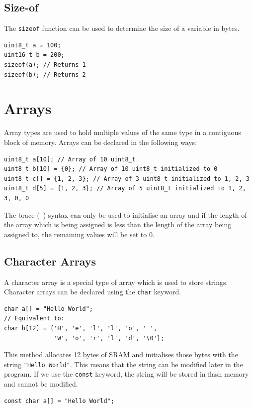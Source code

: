 \documentclass{report}
\begin{document}
\subsection{Size-of}
The \texttt{sizeof} function can be used to determine the size of a variable in bytes.
\begin{verbatim}
uint8_t a = 100;
uint16_t b = 200;
sizeof(a); // Returns 1
sizeof(b); // Returns 2
\end{verbatim}
\section{Arrays}
Array types are used to hold multiple values of the same type
in a contiguous block of memory.
Arrays can be declared in the following ways:
\begin{verbatim}
uint8_t a[10]; // Array of 10 uint8_t
uint8_t b[10] = {0}; // Array of 10 uint8_t initialized to 0
uint8_t c[] = {1, 2, 3}; // Array of 3 uint8_t initialized to 1, 2, 3
uint8_t d[5] = {1, 2, 3}; // Array of 5 uint8_t initialized to 1, 2, 3, 0, 0
\end{verbatim}
The brace (\texttt{{ }}) syntax can only be used to initialise an array and if the length of the array which is being
assigned is less than the length of the array being assigned to, the remaining values will be set to 0.
\subsection{Character Arrays}
A character array is a special type of array which is used to store strings.
Character arrays can be declared using the \texttt{char} keyword.
\begin{verbatim}
char a[] = "Hello World";
// Equivalent to:
char b[12] = {'H', 'e', 'l', 'l', 'o', ' ',
              'W', 'o', 'r', 'l', 'd', '\0'};
\end{verbatim}
This method allocates 12 bytes of SRAM and
initialises those bytes with the string \texttt{"Hello World"}. %
This means that the string can be modified later in the program.
If we use the \texttt{const} keyword, the string will be stored in flash memory and cannot be modified.
\begin{verbatim}
const char a[] = "Hello World";
\end{verbatim}
\end{document}
